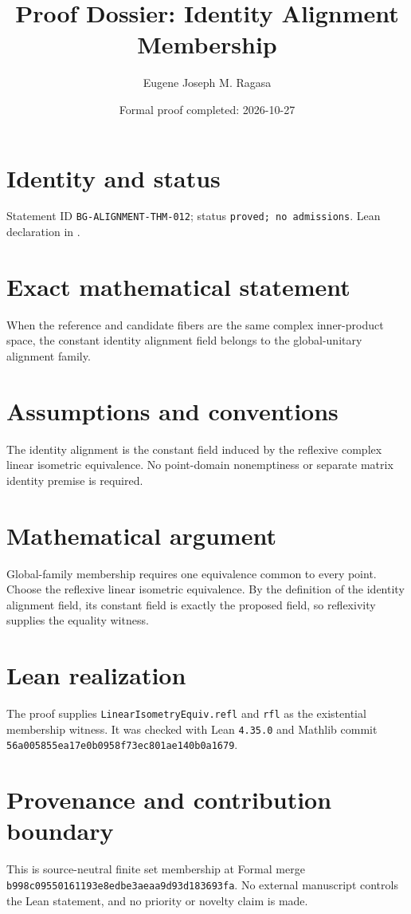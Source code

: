 \documentclass[11pt]{article}
\title{Proof Dossier: Identity Alignment Membership}
\author{Eugene Joseph M. Ragasa}
\date{Formal proof completed: 2026-10-27}
\begin{document}
\raggedright
\maketitle

\section{Identity and status}
Statement ID \texttt{BG-ALIGNMENT-THM-012}; status \texttt{proved; no admissions}. Lean declaration
 in
.

\section{Exact mathematical statement}
When the reference and candidate fibers are the same complex inner-product space, the constant
identity alignment field belongs to the global-unitary alignment family.

\section{Assumptions and conventions}
The identity alignment is the constant field induced by the reflexive complex linear isometric
equivalence. No point-domain nonemptiness or separate matrix identity premise is required.

\section{Mathematical argument}
Global-family membership requires one equivalence common to every point. Choose the reflexive
linear isometric equivalence. By the definition of the identity alignment field, its constant
field is exactly the proposed field, so reflexivity supplies the equality witness.

\section{Lean realization}
The proof supplies \texttt{LinearIsometryEquiv.refl} and \texttt{rfl} as the existential
membership witness. It was checked with Lean \texttt{4.35.0} and Mathlib commit
\texttt{56a005855ea17e0b0958f73ec801ae140b0a1679}.

\section{Provenance and contribution boundary}
This is source-neutral finite set membership at Formal merge
\texttt{b998c09550161193e8edbe3aeaa9d93d183693fa}. No external manuscript controls the Lean
statement, and no priority or novelty claim is made.
\end{document}
